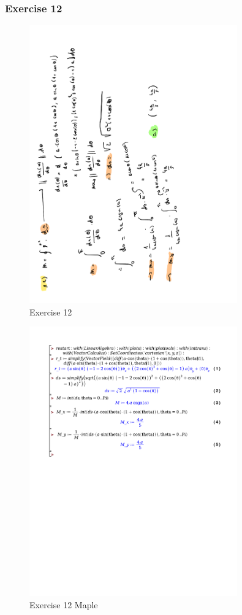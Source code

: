 \documentclass[a4paper]{report}
\begin{document}
\subsubsection{Exercise 12}

\begin{figure}[H]
	\centering
	\includegraphics[angle=-90, width=0.8\textwidth]{assets/huis_6_ex_12.pdf}
	\caption{Exercise 12}
	\label{fig:huis_6_ex_12}
\end{figure}

\begin{figure}[H]
	\centering
	\includegraphics[width=0.8\textwidth]{exercises/huis_6_ex_12.pdf}
	\caption{Exercise 12 Maple}
	\label{fig:huis_6_ex_12_maple}
\end{figure}
\end{document}
